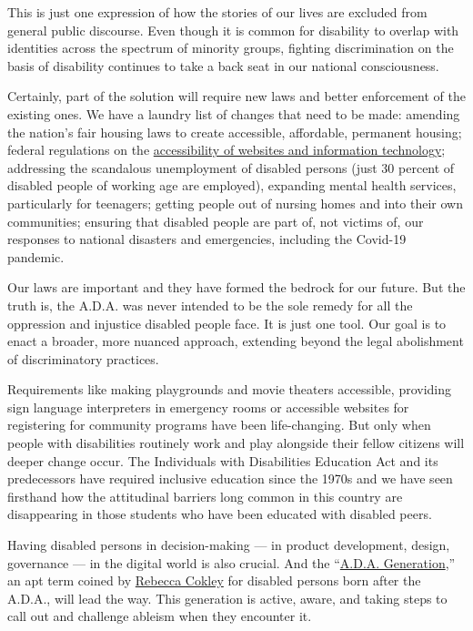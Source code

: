 This is just one expression of how the stories of our lives are excluded
from general public discourse. Even though it is common for disability
to overlap with identities across the spectrum of minority groups,
fighting discrimination on the basis of disability continues to take a
back seat in our national consciousness.

Certainly, part of the solution will require new laws and better
enforcement of the existing ones. We have a laundry list of changes that
need to be made: amending the nation's fair housing laws to create
accessible, affordable, permanent housing; federal regulations on the
\href{https://www.nytimes3xbfgragh.onion/2020/07/14/style/assistive-technology.html}{accessibility
of websites and information technology}; addressing the scandalous
unemployment of disabled persons (just 30 percent of disabled people of
working age are employed), expanding mental health services,
particularly for teenagers; getting people out of nursing homes and into
their own communities; ensuring that disabled people are part of, not
victims of, our responses to national disasters and emergencies,
including the Covid-19 pandemic.

Our laws are important and they have formed the bedrock for our future.
But the truth is, the A.D.A. was never intended to be the sole remedy
for all the oppression and injustice disabled people face. It is just
one tool. Our goal is to enact a broader, more nuanced approach,
extending beyond the legal abolishment of discriminatory practices.

Requirements like making playgrounds and movie theaters accessible,
providing sign language interpreters in emergency rooms or accessible
websites for registering for community programs have been life-changing.
But only when people with disabilities routinely work and play alongside
their fellow citizens will deeper change occur. The Individuals with
Disabilities Education Act and its predecessors have required inclusive
education since the 1970s and we have seen firsthand how the attitudinal
barriers long common in this country are disappearing in those students
who have been educated with disabled peers.

Having disabled persons in decision-making --- in product development,
design, governance --- in the digital world is also crucial. And the
``\href{https://www.nytimes3xbfgragh.onion/2020/07/17/style/americans-with-disabilities-act.html}{A.D.A.
Generation},'' an apt term coined by
\href{https://www.refinery29.com/en-us/2020/07/9923121/ada-american-disabilities-act-money-coronavirus}{Rebecca
Cokley} for disabled persons born after the A.D.A., will lead the way.
This generation is active, aware, and taking steps to call out and
challenge ableism when they encounter it.

